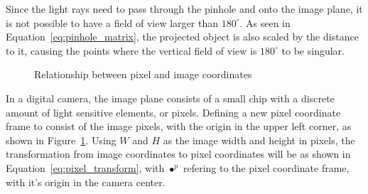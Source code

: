 Since the light rays need to pass through the pinhole and onto the image plane, it is not possible to have a field of view larger than $180^\circ$. As seen in Equation~\eqref{eq:pinhole_matrix}, the projected object is also scaled by the distance to it, causing the points where the vertical field of view is $180^\circ$ to be singular. 

\begin{figure}[!htb]
    \centering
    
    \caption{Relationship between pixel and image coordinates}
    \label{fig:rel_img_pixel}
\end{figure}

In a digital camera, the image plane consists of a small chip with a discrete amount of light sensitive elements, or pixels. Defining a new pixel coordinate frame to consist of the image pixels, with the origin in the upper left corner, as shown in Figure~\ref{fig:rel_img_pixel}. Using $W$ and $H$ as the image width and height in pixels, the transformation from image coordinates to pixel coordinates will be as shown in Equation~\eqref{eq:pixel_transform}, with $\bullet^p$ refering to the pixel coordinate frame, with it's origin in the camera center.

